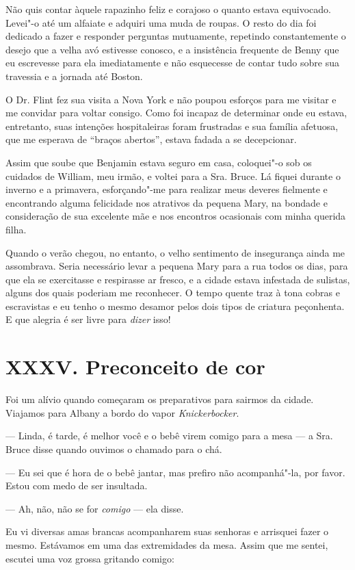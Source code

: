 Não quis contar àquele rapazinho feliz
e corajoso o quanto estava equivocado. Levei"-o até um alfaiate e adquiri
uma muda de roupas. O resto do dia foi dedicado a fazer e responder
perguntas mutuamente, repetindo constantemente o desejo que a velha avó
estivesse conosco, e a insistência frequente de Benny que eu escrevesse
para ela imediatamente e não esquecesse de contar tudo sobre sua
travessia e a jornada até Boston.

O Dr. Flint fez sua visita a Nova York
e não poupou esforços para me visitar e me convidar para voltar consigo.
Como foi incapaz de determinar onde eu estava, entretanto, suas
intenções hospitaleiras foram frustradas e sua família afetuosa, que me
esperava de ``braços abertos'', estava fadada a se decepcionar.

Assim que soube que Benjamin estava
seguro em casa, coloquei"-o sob os cuidados de William, meu irmão, e
voltei para a Sra. Bruce. Lá fiquei durante o inverno e a primavera,
esforçando"-me para realizar meus deveres fielmente e encontrando alguma
felicidade nos atrativos da pequena Mary, na bondade e consideração de
sua excelente mãe e nos encontros ocasionais com minha querida filha.

Quando o verão chegou, no entanto, o
velho sentimento de insegurança ainda me assombrava. Seria necessário
levar a pequena Mary para a rua todos os dias, para que ela se
exercitasse e respirasse ar fresco, e a cidade estava infestada de
sulistas, alguns dos quais poderiam me reconhecer. O tempo quente traz à
tona cobras e escravistas e eu tenho o mesmo desamor pelos dois tipos de
criatura peçonhenta. E que alegria é ser livre para \emph{dizer} isso!

\chapter{XXXV. Preconceito de cor}

Foi um alívio quando começaram os
preparativos para sairmos da cidade. Viajamos para Albany a bordo do
vapor \emph{Knickerbocker}.

--- Linda, é tarde, é melhor você e o bebê virem comigo para a mesa ---
a Sra. Bruce disse quando ouvimos o chamado para o chá.

--- Eu sei que é hora de o bebê jantar, mas prefiro não acompanhá"-la,
por favor. Estou com medo de ser insultada.

--- Ah, não, não se for \emph{comigo} --- ela disse.

Eu vi diversas amas brancas acompanharem suas senhoras e arrisquei fazer
o mesmo. Estávamos em uma das extremidades da mesa. Assim que me sentei,
escutei uma voz grossa gritando comigo:

